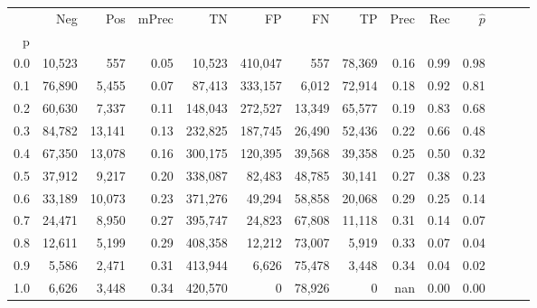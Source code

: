 \begin{tabular}{rrrrrrrrrrrrrr}
\toprule
{} &     Neg &     Pos & mPrec &       TN &       FP &      FN &      TP &  Prec &   Rec & $\hat{p}$ \\
p   &         &         &       &          &          &         &         &       &       &           \\
\midrule
0.0 &  10,523 &     557 &  0.05 &   10,523 &  410,047 &     557 &  78,369 &  0.16 &  0.99 &      0.98 \\
0.1 &  76,890 &   5,455 &  0.07 &   87,413 &  333,157 &   6,012 &  72,914 &  0.18 &  0.92 &      0.81 \\
0.2 &  60,630 &   7,337 &  0.11 &  148,043 &  272,527 &  13,349 &  65,577 &  0.19 &  0.83 &      0.68 \\
0.3 &  84,782 &  13,141 &  0.13 &  232,825 &  187,745 &  26,490 &  52,436 &  0.22 &  0.66 &      0.48 \\
0.4 &  67,350 &  13,078 &  0.16 &  300,175 &  120,395 &  39,568 &  39,358 &  0.25 &  0.50 &      0.32 \\
0.5 &  37,912 &   9,217 &  0.20 &  338,087 &   82,483 &  48,785 &  30,141 &  0.27 &  0.38 &      0.23 \\
0.6 &  33,189 &  10,073 &  0.23 &  371,276 &   49,294 &  58,858 &  20,068 &  0.29 &  0.25 &      0.14 \\
0.7 &  24,471 &   8,950 &  0.27 &  395,747 &   24,823 &  67,808 &  11,118 &  0.31 &  0.14 &      0.07 \\
0.8 &  12,611 &   5,199 &  0.29 &  408,358 &   12,212 &  73,007 &   5,919 &  0.33 &  0.07 &      0.04 \\
0.9 &   5,586 &   2,471 &  0.31 &  413,944 &    6,626 &  75,478 &   3,448 &  0.34 &  0.04 &      0.02 \\
1.0 &   6,626 &   3,448 &  0.34 &  420,570 &        0 &  78,926 &       0 &   nan &  0.00 &      0.00 \\
\bottomrule
\end{tabular}
